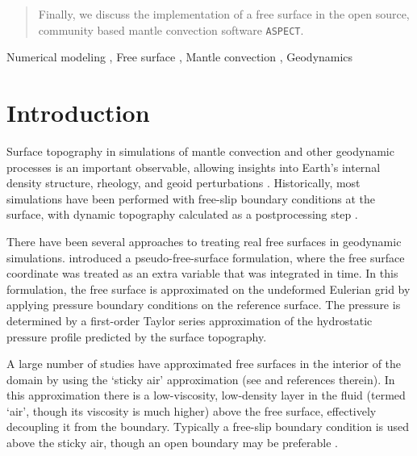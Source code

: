 \documentclass[preprint,12pt,authoryear]{elsarticle}
\begin{document}
\begin{frontmatter}
\begin{abstract}
Finally, we discuss the implementation of a free surface in the open source, community based
mantle convection software \texttt{ASPECT}.
\end{abstract}

\begin{keyword}
Numerical modeling \sep
Free surface \sep
Mantle convection \sep
Geodynamics



\end{keyword}

\end{frontmatter}

\linenumbers

\section{Introduction}
\label{sec:intro}

Surface topography in simulations of mantle convection and other geodynamic processes is an important observable,
allowing insights into Earth's internal density structure, rheology, and geoid perturbations \citep[e.g.][]{richards1984geoid, hager1985lower, baumann2014constraining}.
Historically, most simulations have been performed with free-slip boundary conditions at the surface, 
with dynamic topography calculated as a postprocessing step \citep[e.g.][]{jarvis1982mantle, zhong2000role}.

There have been several approaches to treating real free surfaces in geodynamic simulations.
\citet{zhong1996free} introduced a pseudo-free-surface formulation, where the free surface coordinate was
treated as an extra variable that was integrated in time. In this formulation, the free surface 
is approximated on the undeformed Eulerian grid by applying pressure boundary conditions on the reference surface.
The pressure is determined by a first-order Taylor series approximation of the hydrostatic pressure profile 
predicted by the surface topography.

A large number of studies have approximated free surfaces in the interior of the domain by using the 
`sticky air' approximation (see \citet{crameri2012comparison} and references therein). In this approximation there is a low-viscosity, low-density layer in the fluid 
(termed `air', though its viscosity is much higher) above the free surface, effectively decoupling it from the boundary. 
Typically a free-slip boundary condition is used above the sticky air, though an open boundary may be preferable \citep{hillebrand2014using}. 
\end{document}

